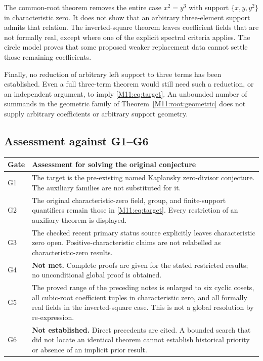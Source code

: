 \documentclass[11pt,a4paper,oneside]{report}
\theoremstyle{definition}
\theoremstyle{remark}
\begin{document}
The common-root theorem removes the entire case $x^2=y^3$ with
support $\{x,y,y^2\}$ in characteristic zero. It does not show
that an arbitrary three-element support admits that relation.
The inverted-square theorem leaves coefficient fields that are
not formally real, except where one of the explicit spectral
criteria applies. The circle model proves that some proposed
weaker replacement data cannot settle those remaining coefficients.

Finally, no reduction of arbitrary left support to three terms has
been established. Even a full three-term theorem would still need
such a reduction, or an independent argument, to imply
\eqref{M11:eq:target}. An unbounded number of summands in the geometric
family of Theorem~\ref{M11:root:geometric} does not supply arbitrary
coefficients or arbitrary support geometry.

\subsection{Assessment against G1--G6}

\begin{center}
\small
\begin{tabular}{@{}l>{\raggedright\arraybackslash}p{.75\linewidth}@{}}
\toprule
Gate & Assessment for solving the original conjecture\\
\midrule
G1 & The target is the pre-existing named Kaplansky zero-divisor
conjecture. The auxiliary families are not substituted for it.\\[3pt]
G2 & The original characteristic-zero field, group, and finite-support
quantifiers remain those in \eqref{M11:eq:target}. Every restriction
of an auxiliary theorem is displayed.\\[3pt]
G3 & The checked recent primary status source explicitly leaves
characteristic zero open. Positive-characteristic claims are not
relabelled as characteristic-zero results.\\[3pt]
G4 & \textbf{Not met.} Complete proofs are given for the stated
restricted results; no unconditional global proof is obtained.\\[3pt]
G5 & The proved range of the preceding notes is enlarged to six
cyclic cosets, all cubic-root coefficient tuples in characteristic
zero, and all formally real fields in the inverted-square case.
This is not a global resolution by re-expression.\\[3pt]
G6 & \textbf{Not established.} Direct precedents are cited.
A bounded search that did not locate an identical theorem cannot
establish historical priority or absence of an implicit prior result.\\
\bottomrule
\end{tabular}
\end{center}
\end{document}
